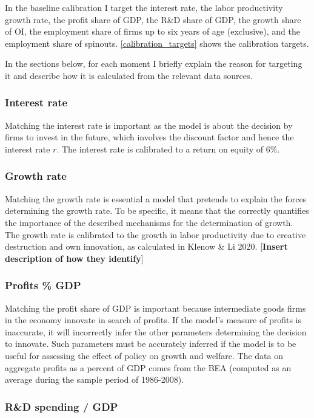 \documentclass[11pt,english]{article}
\theoremstyle{remark}
\begin{document}
In the baseline calibration I target the interest rate, the labor productivity growth rate, the profit share of GDP, the R\&D share of GDP, the growth share of OI, the employment share of firms up to six years of age (exclusive), and the employment share of spinouts. \autoref{calibration_targets} shows the calibration targets. 

In the sections below, for each moment I briefly explain the reason for targeting it and describe how it is calculated from the relevant data sources.

\subsubsection{Interest rate}

Matching the interest rate is important as the model is about the decision by firms to invest in the future, which involves the discount factor and hence the interest rate $r$. The interest rate is calibrated to a return on equity of 6\%. 

\subsubsection{Growth rate}

Matching the growth rate is essential a model that pretends to explain the forces determining the growth rate. To be specific, it means that the correctly quantifies the importance of the described mechanisms for the determination of growth. The growth rate is calibrated to the growth in labor productivity due to creative destruction and own innovation, as calculated in Klenow \& Li 2020. [\textbf{Insert description of how they identify}]

\subsubsection{Profits \% GDP} 

Matching the profit share of GDP is important because intermediate goods firms in the economy innovate in search of profits. If the model's measure of profits is inaccurate, it will incorrectly infer the other parameters determining the decision to innovate. Such parameters must be accurately inferred if the model is to be useful for assessing the effect of policy on growth and welfare. The data on aggregate profits as a percent of GDP comes from the BEA (computed as an average during the sample period of 1986-2008). 

\subsubsection{R\&D spending / GDP}
\end{document}
